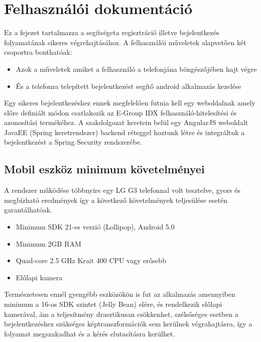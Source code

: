 \section{Felhasználói dokumentáció}
Ez a fejezet tartalmazza a segítségeta regisztráció illetve bejelentkezés folyamatának sikeres végrehajtásához. A felhasználói műveletek alapvetően két csoportra bonthatóak:
\begin{itemize}
\item Azok a műveletek amiket a felhasználó a telefonjána böngészőjében hajt végre
\item És a telefonra telepített bejelentkezést segítő android alkalmazás kezelése
\end{itemize}

Egy sikeres bejelentkezéshez ennek megfelelően futnia kell egy weboldalnak amely előre definiált módon csatlakozik az E-Group IDX felhasználó-hitelesítési és azonosítási termékéhez.
A szakdolgozat keretein belül egy AngularJS weboldalt JavaEE (Spring keretrendszer) backend réteggel hoztunk létre és integráltuk a bejelentkezést a Spring Security rendszerébe.

\subsection{Mobil eszköz minimum követelményei}
A rendszer működése többnyire egy LG G3 telefonnal volt tesztelve, gyors és megbízható eredmények így a következő követelmények teljesülése esetén garantálhatóak.
\begin{itemize}
\item Minimum SDK 21-es verzió (Lollipop), Android 5.0
\item Minimum 2GB RAM
\item Quad-core 2.5 GHz Krait 400 CPU vagy erősebb
\item Előlapi kamera
\end{itemize}

Természetesen ennél gyengébb eszközökön is fut az alkalmazás amennyiben minimum a 16-os SDK szintet (Jelly Bean) elére, és rendelkezik előlapi kamerával, ám a teljesítmény drasztikusan csökkenhet, szélsőséges esetben a bejelentkezéshez szükséges képtranszformációk sem kerülnek végrahajtásra, így a folyamat megszakadhat és a kérés elutasításra kerülhet.

